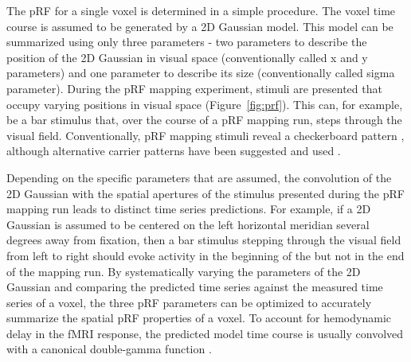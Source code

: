 The pRF for a single voxel is determined in a simple procedure. The voxel time course is assumed to be generated by a 2D Gaussian model. This model can be summarized using only three parameters - two parameters to describe the position of the 2D Gaussian in visual space (conventionally called x and y parameters) and one parameter to describe its size (conventionally called sigma parameter). During the pRF mapping experiment, stimuli are presented that occupy varying positions in visual space (Figure~\ref{fig:prf}). This can, for example, be a bar stimulus that, over the course of a pRF mapping run, steps through the visual field. Conventionally, pRF mapping stimuli reveal a checkerboard pattern \parencite{Dumoulin2008}, although alternative carrier patterns have been suggested and used \parencite{Alvarez2015}.

Depending on the specific parameters that are assumed, the convolution of the 2D Gaussian with the spatial apertures of the stimulus presented during the pRF mapping run leads to distinct time series predictions. For example, if a 2D Gaussian is assumed to be centered on the left horizontal meridian several degrees away from fixation, then a bar stimulus stepping through the visual field from left to right should evoke activity in the beginning of the but not in the end of the mapping run. By systematically varying the parameters of the 2D Gaussian and comparing the predicted time series against the measured time series of a voxel, the three pRF parameters can be optimized to accurately summarize the spatial pRF properties of a voxel. To account for hemodynamic delay in the fMRI response, the predicted model time course is usually convolved with a canonical double-gamma function \parencite{Friston1998}.

